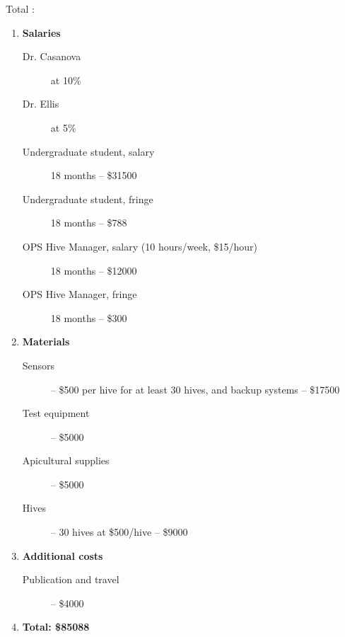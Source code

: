 Total :
\begin{enumerate}
\item \textbf{Salaries}
\begin{description}
\item[Dr. Casanova] at 10\%
\item[Dr. Ellis] at 5\%
\item[Undergraduate student, salary] 18 months -- \$31500
\item[Undergraduate student, fringe] 18 months -- \$788
\item[OPS Hive Manager, salary (10 hours/week, \$15/hour)] 18 months -- \$12000
\item[OPS Hive Manager, fringe] 18 months -- \$300
\end{description}
\item \textbf{Materials}
\begin{description}
\item[Sensors] -- \$500 per hive for at least 30 hives, and backup systems -- \$17500 
\item[Test equipment] -- \$5000 
\item[Apicultural supplies] -- \$5000
\item[Hives] -- 30 hives at \$500/hive -- \$9000
\end{description}
\item \textbf{Additional costs}
\begin{description}
\item[Publication and travel] -- \$4000
\end{description}\item \textbf{Total: \$85088} 
\end{enumerate}
